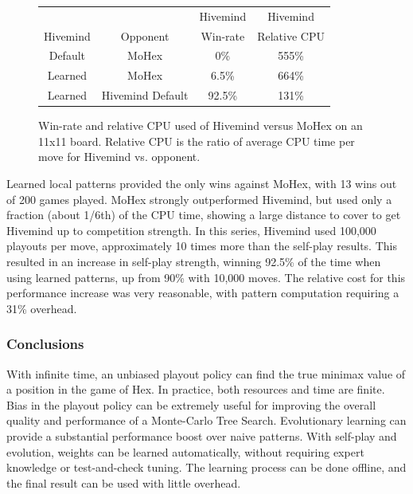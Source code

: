 \documentclass{acm_proc_article-sp}
\begin{document}
\begin{figure}
	\begin{center}
		\begin{tabular}{c  | c c c}
		& &	Hivemind  & Hivemind \\
		Hivemind & Opponent & Win-rate & Relative CPU \\
		\hline
		Default & MoHex & 0\% & 555\% \\
		Learned & MoHex & 6.5\% & 664\% \\
		Learned & Hivemind Default & 92.5\% & 131\% \\
		\end{tabular}
		\caption{Win-rate and relative CPU used of Hivemind versus MoHex on an 11x11 board. Relative CPU is the ratio of average CPU time per move for Hivemind vs. opponent.
		}
		\label{fig:relativecpu}
	\end{center}
\end{figure}

Learned local patterns provided the only wins against MoHex, with 13 wins out of 200 games played. 
MoHex strongly outperformed Hivemind, but used only a fraction (about 1/6th) of the CPU time, showing a large distance to cover to get Hivemind up to competition strength. 
In this series, Hivemind used 100,000 playouts per move, approximately 10 times more than the self-play results. This resulted in an increase in self-play strength, winning 92.5\% of the time when using learned patterns, up from 90\% with 10,000 moves. The relative cost for this performance increase was very reasonable, with pattern computation requiring a 31\% overhead.



\subsubsection* {Conclusions}
With infinite time, an unbiased playout policy can find the true minimax value of a position in the game of Hex. In practice, both resources and time are finite. Bias in the playout policy can be extremely useful for improving the overall quality and performance of a Monte-Carlo Tree Search. Evolutionary learning can provide a substantial performance boost over naive patterns. With self-play and evolution, weights can be learned automatically, without requiring expert knowledge or test-and-check tuning. The learning process can be done offline, and the final result can be used with little overhead.
\end{document}
